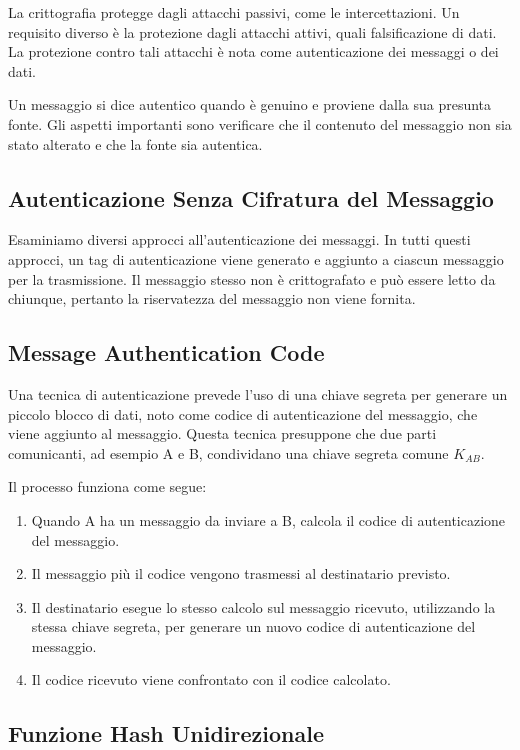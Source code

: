 La crittografia protegge dagli attacchi passivi, come le intercettazioni. Un requisito diverso è la protezione dagli attacchi attivi, quali falsificazione di dati. La protezione contro tali attacchi è nota come autenticazione dei messaggi o dei dati.

Un messaggio si dice autentico quando è genuino e proviene dalla sua presunta fonte. Gli aspetti importanti sono verificare che il contenuto del messaggio non sia stato alterato e che la fonte sia autentica.

\subsection{Autenticazione Senza Cifratura del Messaggio}

Esaminiamo diversi approcci all'autenticazione dei messaggi. In tutti questi approcci, un tag di autenticazione viene generato e aggiunto a ciascun messaggio per la trasmissione. Il messaggio stesso non è crittografato e può essere letto da chiunque, pertanto la riservatezza del messaggio non viene fornita.

\subsection{Message Authentication Code}

Una tecnica di autenticazione prevede l'uso di una chiave segreta per generare un piccolo blocco di dati, noto come codice di autenticazione del messaggio, che viene aggiunto al messaggio. Questa tecnica presuppone che due parti comunicanti, ad esempio A e B, condividano una chiave segreta comune $K_{AB}$.

Il processo funziona come segue:

\begin{enumerate}
    \item Quando A ha un messaggio da inviare a B, calcola il codice di autenticazione del messaggio.
    \item Il messaggio più il codice vengono trasmessi al destinatario previsto.
    \item Il destinatario esegue lo stesso calcolo sul messaggio ricevuto, utilizzando la stessa chiave segreta, per generare un nuovo codice di autenticazione del messaggio.
    \item Il codice ricevuto viene confrontato con il codice calcolato.
\end{enumerate}

\subsection{Funzione Hash Unidirezionale}

